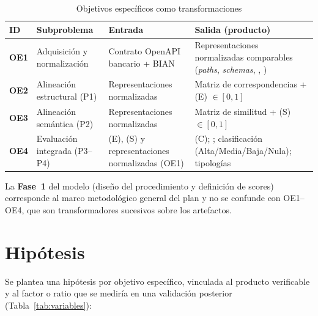 \begin{table}[H]
  \centering
  \caption{Objetivos específicos como transformaciones}
  \label{tab:objetivos-especificos}
  \small
  \begin{tabular}{@{}p{}p{}p{}p{}@{}}
    \toprule
    \textbf{ID} & \textbf{Subproblema} & \textbf{Entrada} & \textbf{Salida (producto)} \\
    \midrule
    \textbf{OE1} &
    Adquisición y normalización &
    Contrato OpenAPI bancario + \ServiceDomain{} BIAN &
    Representaciones normalizadas comparables (\textit{paths}, \textit{schemas},
    \Behavior{}, \BusinessObject{}) \\
    \textbf{OE2} &
    Alineación estructural (P1) &
    Representaciones normalizadas &
    Matriz de correspondencias + \StructuralScore{} (E) $\in [0, 1]$ \\
    \textbf{OE3} &
    Alineación semántica (P2) &
    Representaciones normalizadas &
    Matriz de similitud + \SemanticScore{} (S) $\in [0, 1]$ \\
    \textbf{OE4} &
    Evaluación integrada (P3--P4) &
    \StructuralScore{} (E), \SemanticScore{} (S) y representaciones normalizadas (OE1) &
    \CoverageScore{} (C); \AlignmentScore{}; clasificación (Alta/Media/Baja/Nula); tipologías \\
    \bottomrule
  \end{tabular}
\end{table}

La \textbf{Fase~1} del modelo (diseño del procedimiento y definición de scores) corresponde al
marco metodológico general del plan y no se confunde con OE1--OE4, que son
transformadores sucesivos sobre los artefactos.

\section{Hipótesis}

Se plantea una hipótesis por objetivo específico, vinculada al producto verificable y al factor o
ratio que se mediría en una validación posterior (Tabla~\ref{tab:variables}):


